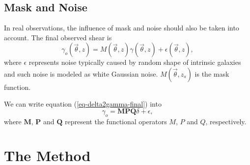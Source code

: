 \documentclass[twocolumn]{aastex62}
\begin{document}
\subsection{Mask and Noise}
In real observations, the influence of mask and noise should also be taken into account. The final observed shear is 
\begin{equation}\label{eq-delta2gamma-final}
\gamma_o(\vec{\theta},z)=M(\vec{\theta},z) \gamma(\vec{\theta},z) + \epsilon(\vec{\theta},z),
\end{equation}
where $\epsilon$ represents noise typically caused by random shape of intrinsic galaxies and such noise is modeled as white Gaussian noise. $M(\vec{\theta},z_s)$ is the mask function.

We can write equation (\ref{eq-delta2gamma-final}) into 
\begin{equation}\label{eq-delta2gamma-operator-final}
\gamma_o =\mathbf{M}  \mathbf{P} \mathbf{Q} \delta + \epsilon,
\end{equation}
where $\mathbf{M}$,  $\mathbf{P}$ and $\mathbf{Q}$ represent the functional operators $M$, $P$ and $Q$, respectively.  

\section{The Method}
\label{sec:kappaMap}
\end{document}
